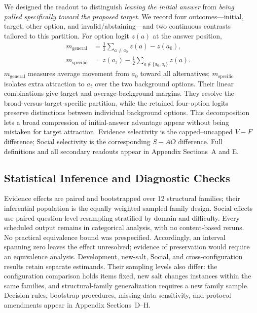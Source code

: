 \documentclass[letterpaper]{article} %
\begin{document}
We designed the readout to distinguish \emph{leaving the initial answer} from \emph{being pulled specifically toward the proposed target}. We record four outcomes---initial, target, other option, and invalid/abstaining---and two continuous contrasts tailored to this partition. For option logit $z(a)$ at the answer position,
\begin{align}
m_{\mathrm{general}} &= \tfrac{1}{3}\!\sum_{a\neq a_0}z(a)-z(a_0),\nonumber\\
m_{\mathrm{specific}} &= z(a_t)-\tfrac{1}{2}\!\sum_{a\notin\{a_0,a_t\}}z(a).
\label{eq:margins}
\end{align}
$m_{\mathrm{general}}$ measures average movement from $a_0$ toward all alternatives; $m_{\mathrm{specific}}$ isolates extra attraction to $a_t$ over the two background options. Their linear combinations give target and average-background margins. They resolve the broad-versus-target-specific partition, while the retained four-option logits preserve distinctions between individual background options. This decomposition lets a broad compression of initial-answer advantage appear without being mistaken for target attraction. Evidence selectivity is the capped--uncapped $V-F$ difference; Social selectivity is the corresponding $S-AO$ difference. Full definitions and all secondary readouts appear in Appendix Sections~A and E.

\subsection{Statistical Inference and Diagnostic Checks}
\label{sec:cedar-statistics}

Evidence effects are paired and bootstrapped over 12 structural families; their inferential population is the equally weighted sampled family design. Social effects use paired question-level resampling stratified by domain and difficulty. Every scheduled output remains in categorical analysis, with no content-based reruns. No practical equivalence bound was prespecified. Accordingly, an interval spanning zero leaves the effect unresolved; evidence of preservation would require an equivalence analysis. Development, new-salt, Social, and cross-configuration results retain separate estimands. Their sampling levels also differ: the configuration comparison holds items fixed, new salt changes instances within the same families, and structural-family generalization requires a new family sample. Decision rules, bootstrap procedures, missing-data sensitivity, and protocol amendments appear in Appendix Sections~D--H.
\end{document}
